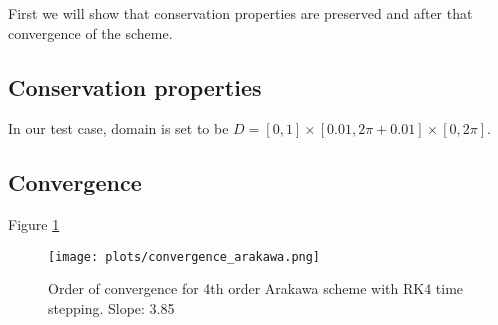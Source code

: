 
First we will show that conservation properties are preserved and after that convergence of the scheme.

\subsection{Conservation properties}
In our test case, domain is set to be $D=[0,1]\times[0.01,2\pi+0.01]\times[0,2\pi]$.

\subsection{Convergence}
Figure \ref{fig:akw_conv}
\begin{figure}[h]
\begin{center}
    \texttt{[image: plots/convergence\_arakawa.png]}
\end{center}
\caption{Order of convergence for 4th order Arakawa scheme with RK4 time stepping. Slope: 3.85}
\label{fig:akw_conv}
\end{figure}